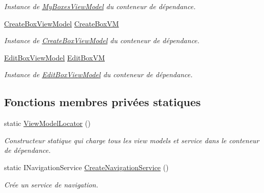 \begin{DoxyCompactItemize}
\begin{DoxyCompactList}\small\item\em Instance de \hyperlink{class_boxes_1_1_view_models_1_1_my_boxes_view_model}{My\+Boxes\+View\+Model} du conteneur de dépendance. \end{DoxyCompactList}\item 
\hyperlink{class_boxes_1_1_view_models_1_1_create_box_view_model}{Create\+Box\+View\+Model} \hyperlink{class_boxes_1_1_view_models_1_1_view_model_locator_abefd92c12ab824f8b5687ba434bae934}{Create\+Box\+VM}
\begin{DoxyCompactList}\small\item\em Instance de \hyperlink{class_boxes_1_1_view_models_1_1_create_box_view_model}{Create\+Box\+View\+Model} du conteneur de dépendance. \end{DoxyCompactList}\item 
\hyperlink{class_boxes_1_1_view_models_1_1_edit_box_view_model}{Edit\+Box\+View\+Model} \hyperlink{class_boxes_1_1_view_models_1_1_view_model_locator_a2f8666506f3b55d02d3a390848347f37}{Edit\+Box\+VM}
\begin{DoxyCompactList}\small\item\em Instance de \hyperlink{class_boxes_1_1_view_models_1_1_edit_box_view_model}{Edit\+Box\+View\+Model} du conteneur de dépendance. \end{DoxyCompactList}\end{DoxyCompactItemize}
\subsection*{Fonctions membres privées statiques}
\begin{DoxyCompactItemize}
\item 
static \hyperlink{class_boxes_1_1_view_models_1_1_view_model_locator_adf6ece9387e3434ad93065c6cd50900a}{View\+Model\+Locator} ()
\begin{DoxyCompactList}\small\item\em Constructeur statique qui charge tous les view models et service dans le conteneur de dépendance. \end{DoxyCompactList}\item 
static I\+Navigation\+Service \hyperlink{class_boxes_1_1_view_models_1_1_view_model_locator_aaf63b49f0223baf4a4b75e5051a28382}{Create\+Navigation\+Service} ()
\begin{DoxyCompactList}\small\item\em Crée un service de navigation. \end{DoxyCompactList}\end{DoxyCompactItemize}


